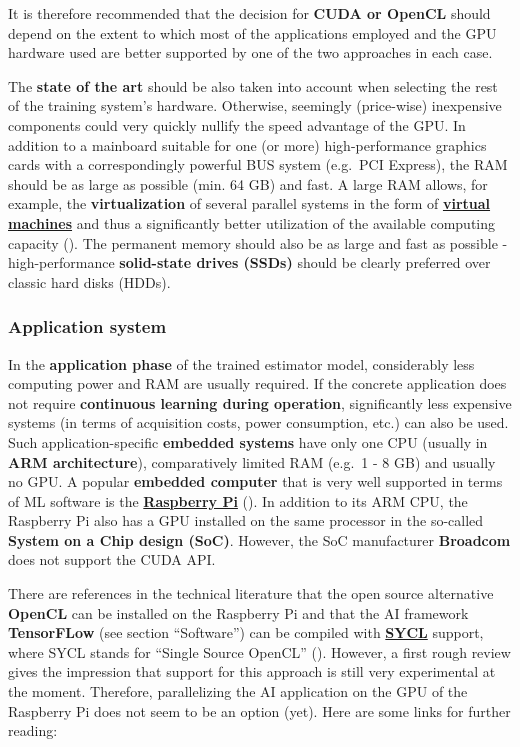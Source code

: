 \documentclass [oneside,10pt,a4paper,ngerman,BCOR10mm,headsepline,parindent,final]{scrartcl}
\begin{document}
It is therefore recommended that the decision for \textbf{CUDA or
OpenCL} should depend on the extent to which most of the applications
employed and the GPU hardware used are better supported by one of the
two approaches in each case.

The \textbf{state of the art} should be also taken into account when
selecting the rest of the training system's hardware. Otherwise,
seemingly (price-wise) inexpensive components could very quickly nullify
the speed advantage of the GPU. In addition to a mainboard suitable for
one (or more) high-performance graphics cards with a correspondingly
powerful BUS system (e.g.~PCI Express), the RAM should be as large as
possible (min. 64 GB) and fast. A large RAM allows, for example, the
\textbf{virtualization} of several parallel systems in the form of
\textbf{\href{https://en.wikipedia.org/wiki/Virtual_machine}{virtual
machines}} and thus a significantly better utilization of the available
computing capacity (\cite{Wiki_VM}). The permanent memory should also be
as large and fast as possible - high-performance \textbf{solid-state
drives (SSDs)} should be clearly preferred over classic hard disks
(HDDs).

    \hypertarget{application-system}{%
\subsubsection{Application system}\label{application-system}}

In the \textbf{application phase} of the trained estimator model,
considerably less computing power and RAM are usually required. If the
concrete application does not require \textbf{continuous learning during
operation}, significantly less expensive systems (in terms of
acquisition costs, power consumption, etc.) can also be used. Such
application-specific \textbf{embedded systems} have only one CPU
(usually in \textbf{ARM architecture}), comparatively limited RAM
(e.g.~1 - 8 GB) and usually no GPU. A popular \textbf{embedded computer}
that is very well supported in terms of ML software is the
\textbf{\href{https://en.wikipedia.org/wiki/Raspberry_Pi}{Raspberry Pi}}
(\cite{Wiki_Raspi}). In addition to its ARM CPU, the Raspberry Pi also
has a GPU installed on the same processor in the so-called
\textbf{System on a Chip design (SoC)}. However, the SoC manufacturer
\textbf{Broadcom} does not support the CUDA API.

There are references in the technical literature that the open source
alternative \textbf{OpenCL} can be installed on the Raspberry Pi and
that the AI framework \textbf{TensorFLow} (see section ``Software'') can
be compiled with
\textbf{\href{https://en.wikipedia.org/wiki/SYCL}{SYCL}} support, where
SYCL stands for ``Single Source OpenCL'' (\cite{Wiki_SYCL}). However, a
first rough review gives the impression that support for this approach
is still very experimental at the moment. Therefore, parallelizing the
AI application on the GPU of the Raspberry Pi does not seem to be an
option (yet). Here are some links for further reading:
\end{document}
